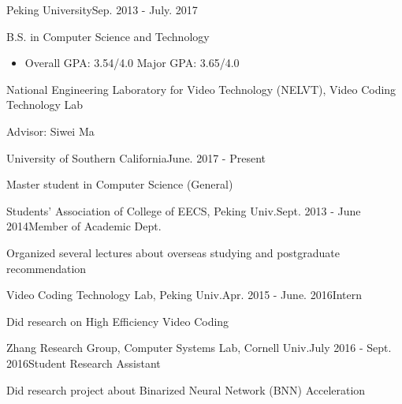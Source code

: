 \documentclass{joel_cv}
\begin{document}
\pagestyle{empty}

\begin{cvHeader} 
\end{cvHeader}

%
%

\begin{sectionContentSimple}{Peking University}{Sep. 2013 - July. 2017}
	\item B.S. in Computer Science and Technology
	\begin{itemize}
		\item Overall GPA: 3.54/4.0 \quad Major GPA: 3.65/4.0
	\end{itemize}
	\item National Engineering Laboratory for Video Technology (NELVT), Video Coding Technology Lab
	\item Advisor: Siwei Ma
\end{sectionContentSimple}

\begin{sectionContentSimple}{University of Southern California}{June. 2017 - Present}
	\item Master student in Computer Science (General)
\end{sectionContentSimple}


%
%


\begin{sectionContentNormal}{Students' Association of College of EECS, Peking Univ.}{Sept. 2013 - June 2014}{Member of Academic Dept.}
	\item Organized several lectures about overseas studying and postgraduate recommendation
\end{sectionContentNormal}

\begin{sectionContentNormal}{Video Coding Technology Lab, Peking Univ.}{Apr. 2015 - June. 2016}{Intern}
	\item Did research on High Efficiency Video Coding
\end{sectionContentNormal}

\begin{sectionContentNormal}{Zhang Research Group, Computer Systems Lab, Cornell Univ.}{July 2016 - Sept. 2016}{Student Research Assistant}
	\item Did research project about Binarized Neural Network (BNN) Acceleration
\end{sectionContentNormal}
\end{document}
